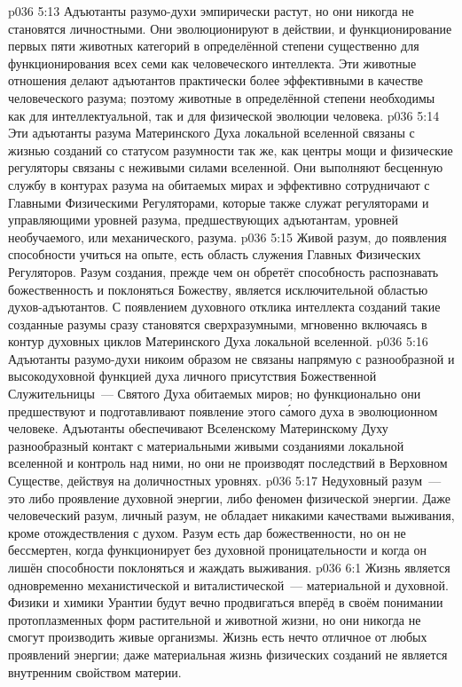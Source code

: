 \vs p036 5:13 \pc Адъютанты разумо\hyp{}духи эмпирически растут, но они никогда не становятся личностными. Они эволюционируют в действии, и функционирование первых пяти животных категорий в определённой степени существенно для функционирования всех семи как человеческого интеллекта. Эти животные отношения делают адъютантов практически более эффективными в качестве человеческого разума; поэтому животные в определённой степени необходимы как для интеллектуальной, так и для физической эволюции человека.
\vs p036 5:14 Эти адъютанты разума Материнского Духа локальной вселенной связаны с жизнью созданий со статусом разумности так же, как центры мощи и физические регуляторы связаны с неживыми силами вселенной. Они выполняют бесценную службу в контурах разума на обитаемых мирах и эффективно сотрудничают с Главными Физическими Регуляторами, которые также служат регуляторами и управляющими уровней разума, предшествующих адъютантам, уровней необучаемого, или механического, разума.
\vs p036 5:15 Живой разум, до появления способности учиться на опыте, есть область служения Главных Физических Регуляторов. Разум создания, прежде чем он обретёт способность распознавать божественность и поклоняться Божеству, является исключительной областью  духов\hyp{}адъютантов. С появлением духовного отклика интеллекта созданий такие созданные разумы сразу становятся сверхразумными, мгновенно включаясь в контур духовных циклов Материнского Духа локальной вселенной.
\vs p036 5:16 Адъютанты разумо\hyp{}духи никоим образом не связаны напрямую с разнообразной и высокодуховной функцией духа личного присутствия Божественной Служительницы~--- Святого Духа обитаемых миров; но функционально они предшествуют и подготавливают появление этого с\'амого духа в эволюционном человеке. Адъютанты обеспечивают Вселенскому Материнскому Духу разнообразный контакт с материальными живыми созданиями локальной вселенной и контроль над ними, но они не производят последствий в Верховном Существе, действуя на доличностных уровнях.
\vs p036 5:17 \pc Недуховный разум~--- это либо проявление духовной энергии, либо феномен физической энергии. Даже человеческий разум, личный разум, не обладает никакими качествами выживания, кроме отождествления с духом. Разум есть дар божественности, но он не бессмертен, когда функционирует без духовной проницательности и когда он лишён способности поклоняться и жаждать выживания.
\vs p036 6:1 Жизнь является одновременно механистической и виталистической~--- материальной и духовной. Физики и химики Урантии будут вечно продвигаться вперёд в своём понимании протоплазменных форм растительной и животной жизни, но они никогда не смогут производить живые организмы. Жизнь есть нечто отличное от любых проявлений энергии; даже материальная жизнь физических созданий не является внутренним свойством материи.
